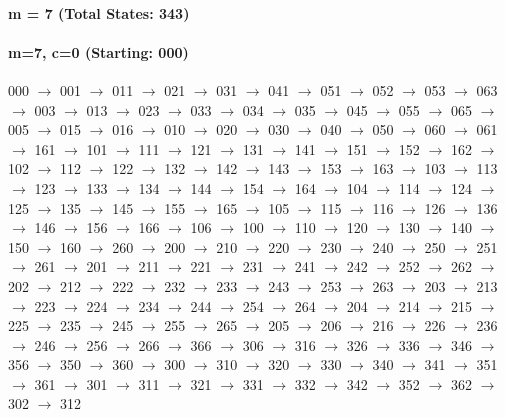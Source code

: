 \paragraph{m = 7 (Total States: 343)}



\paragraph{ m=7, c=0 (Starting: 000)}



000 $\rightarrow$ 001 $\rightarrow$ 011 $\rightarrow$ 021 $\rightarrow$ 031 $\rightarrow$ 041 $\rightarrow$ 051 $\rightarrow$ 052 $\rightarrow$ 053 $\rightarrow$ 063 $\rightarrow$ 003 $\rightarrow$ 013 $\rightarrow$ 023 $\rightarrow$ 033 $\rightarrow$ 034 $\rightarrow$ 035 $\rightarrow$ 045 $\rightarrow$ 055 $\rightarrow$ 065 $\rightarrow$ 005 $\rightarrow$ 015 $\rightarrow$ 016 $\rightarrow$ 010 $\rightarrow$ 020 $\rightarrow$ 030 $\rightarrow$ 040 $\rightarrow$ 050 $\rightarrow$ 060 $\rightarrow$ 061 $\rightarrow$ 161 $\rightarrow$ 101 $\rightarrow$ 111 $\rightarrow$ 121 $\rightarrow$ 131 $\rightarrow$ 141 $\rightarrow$ 151 $\rightarrow$ 152 $\rightarrow$ 162 $\rightarrow$ 102 $\rightarrow$ 112 $\rightarrow$ 122 $\rightarrow$ 132 $\rightarrow$ 142 $\rightarrow$ 143 $\rightarrow$ 153 $\rightarrow$ 163 $\rightarrow$ 103 $\rightarrow$ 113 $\rightarrow$ 123 $\rightarrow$ 133 $\rightarrow$ 134 $\rightarrow$ 144 $\rightarrow$ 154 $\rightarrow$ 164 $\rightarrow$ 104 $\rightarrow$ 114 $\rightarrow$ 124 $\rightarrow$ 125 $\rightarrow$ 135 $\rightarrow$ 145 $\rightarrow$ 155 $\rightarrow$ 165 $\rightarrow$ 105 $\rightarrow$ 115 $\rightarrow$ 116 $\rightarrow$ 126 $\rightarrow$ 136 $\rightarrow$ 146 $\rightarrow$ 156 $\rightarrow$ 166 $\rightarrow$ 106 $\rightarrow$ 100 $\rightarrow$ 110 $\rightarrow$ 120 $\rightarrow$ 130 $\rightarrow$ 140 $\rightarrow$ 150 $\rightarrow$ 160 $\rightarrow$ 260 $\rightarrow$ 200 $\rightarrow$ 210 $\rightarrow$ 220 $\rightarrow$ 230 $\rightarrow$ 240 $\rightarrow$ 250 $\rightarrow$ 251 $\rightarrow$ 261 $\rightarrow$ 201 $\rightarrow$ 211 $\rightarrow$ 221 $\rightarrow$ 231 $\rightarrow$ 241 $\rightarrow$ 242 $\rightarrow$ 252 $\rightarrow$ 262 $\rightarrow$ 202 $\rightarrow$ 212 $\rightarrow$ 222 $\rightarrow$ 232 $\rightarrow$ 233 $\rightarrow$ 243 $\rightarrow$ 253 $\rightarrow$ 263 $\rightarrow$ 203 $\rightarrow$ 213 $\rightarrow$ 223 $\rightarrow$ 224 $\rightarrow$ 234 $\rightarrow$ 244 $\rightarrow$ 254 $\rightarrow$ 264 $\rightarrow$ 204 $\rightarrow$ 214 $\rightarrow$ 215 $\rightarrow$ 225 $\rightarrow$ 235 $\rightarrow$ 245 $\rightarrow$ 255 $\rightarrow$ 265 $\rightarrow$ 205 $\rightarrow$ 206 $\rightarrow$ 216 $\rightarrow$ 226 $\rightarrow$ 236 $\rightarrow$ 246 $\rightarrow$ 256 $\rightarrow$ 266 $\rightarrow$ 366 $\rightarrow$ 306 $\rightarrow$ 316 $\rightarrow$ 326 $\rightarrow$ 336 $\rightarrow$ 346 $\rightarrow$ 356 $\rightarrow$ 350 $\rightarrow$ 360 $\rightarrow$ 300 $\rightarrow$ 310 $\rightarrow$ 320 $\rightarrow$ 330 $\rightarrow$ 340 $\rightarrow$ 341 $\rightarrow$ 351 $\rightarrow$ 361 $\rightarrow$ 301 $\rightarrow$ 311 $\rightarrow$ 321 $\rightarrow$ 331 $\rightarrow$ 332 $\rightarrow$ 342 $\rightarrow$ 352 $\rightarrow$ 362 $\rightarrow$ 302 $\rightarrow$ 312 